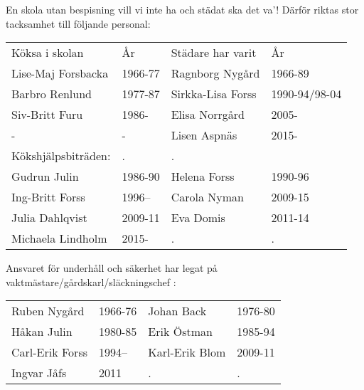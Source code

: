 En skola utan bespisning vill vi inte ha och städat ska det va'! Därför riktas stor tacksamhet till följande personal:
\begin{center}
  \begin{tabular}{l l l l}
    \hline
    Köksa i skolan & År & Städare har varit & År \\
    Lise-Maj Forsbacka & 1966-77 & Ragnborg Nygård & 1966-89 \\
    Barbro Renlund & 1977-87 & Sirkka-Lisa Forss & 1990-94/98-04 \\
    Siv-Britt Furu & 1986- &  Elisa Norrgård & 2005- \\
    - & - & Lisen Aspnäs & 2015- \\
    Kökshjälpsbiträden: & . & . & \\
    Gudrun Julin & 1986-90 & Helena Forss & 1990-96 \\
    Ing-Britt Forss & 1996--\allowbreak 2009 & Carola Nyman & 2009-15 \\
    Julia Dahlqvist & 2009-11 & Eva Domis & 2011-14 \\
    Michaela Lindholm & 2015- & . & .  \\
    \hline
  \end{tabular}
\end{center}

Ansvaret för underhåll och säkerhet har legat på vaktmästare/gårdskarl/släckningschef :
\begin{center}
  \begin{tabular}{l l l l}
    \hline
    Ruben Nygård & 1966-76 & Johan Back & 1976-80 \\
    Håkan Julin & 1980-85 & Erik Östman & 1985-94 \\
    Carl-Erik Forss & 1994--\allowbreak 2009 & Karl-Erik Blom & 2009-11 \\
    Ingvar Jåfs & 2011 & . & .  \\
    \hline
  \end{tabular}
\end{center}

